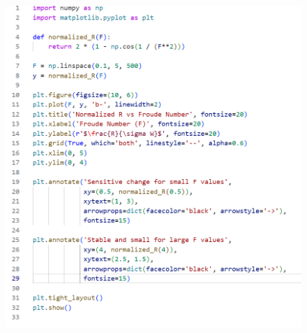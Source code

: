     \begin{figure}[h]
        \includegraphics[width=\textwidth, height=0.8\textheight]
        {images/plotR.png}
    \end{figure}




